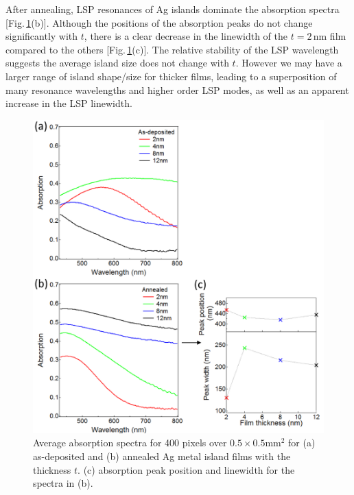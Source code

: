 After annealing, LSP resonances of Ag islands dominate the absorption spectra [Fig.\,\ref{6Fig6}(b)]. Although the positions of the absorption peaks do not change significantly with $t$, there is a clear decrease in the linewidth of the $t=2$\,nm film compared to the others [Fig.\,\ref{6Fig6}(c)]. The relative stability of the LSP wavelength suggests the average island size does not change with $t$. However we may have a larger range of island shape/size for thicker films, leading to a superposition of many resonance wavelengths and higher order LSP modes, as well as an apparent increase in the LSP linewidth.
\begin{figure}[h!] 
\centering    
\includegraphics[width=\textwidth]{Fig6}
\caption{Average absorption spectra for 400 pixels over $0.5\times0.5$mm$^2$ for (a) as-deposited and (b) annealed Ag metal island films with the thickness $t$. (c) absorption peak position and linewidth for the spectra in (b).}
\label{6Fig6}
\end{figure}

